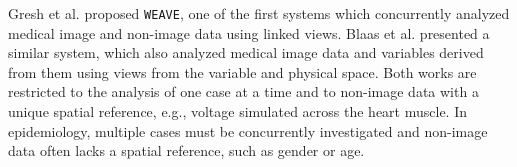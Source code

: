 \documentclass[journal]{style/vgtc} 			          %
\newcommand{\com}[1]{\textcolor{orange}{\uline{#1}}}
\begin{document}
Gresh et al. \cite{Gresh2000} proposed \texttt{WEAVE}, one of the first systems which concurrently analyzed medical image and non-image data using linked views.
%
Blaas et al. \cite{Blaas2007} presented a similar system, which also analyzed medical image data and variables derived from them using views from the variable and physical space.
%
Both works are restricted to the analysis of one case at a time and to non-image data with a unique spatial reference, e.g., voltage simulated across the heart muscle.
%
In epidemiology, multiple cases must be concurrently investigated and non-image data often lacks a spatial reference, such as gender or age.
%
\end{document}
